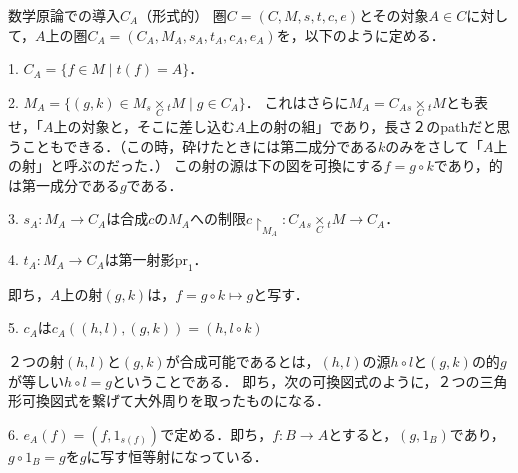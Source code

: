 \documentclass[uplatex, dvipdfmx]{jsarticle}
\begin{document}
\begin{itembox}[l]{数学原論での導入$C_A$（形式的）}
    圏$C=(C,M,s,t,c,e)$とその対象$A\in C$に対して，$A$上の圏$C_A=(C_A, M_A, s_A, t_A, c_A, e_A)$を，以下のように定める．

    1. $C_A=\{ f\in M\mid t(f)=A \}$．

    2. $M_A=\{(g,k)\in M_s\underset{C}{\times}{}_tM\mid g\in C_A\}$．
    これはさらに$M_A=C_A{}_s\underset{C}{\times}{}_tM$とも表せ，「$A$上の対象と，そこに差し込む$A$上の射の組」であり，長さ２のpathだと思うこともできる．（この時，砕けたときには第二成分である$k$のみをさして「$A$上の射」と呼ぶのだった．）
    この射の源は下の図を可換にする$f=g\circ k$であり，的は第一成分である$g$である．
    \begin{center}
    \end{center}

    3. $s_A:M_A\to C_A$は合成$c$の$M_A$への制限$c\restriction_{M_A}:C_A{}_s\underset{C}{\times}{}_tM\to C_A$．

    4. $t_A:M_A\to C_A$は第一射影$\mathrm{pr}_1$．

    即ち，$A$上の射$(g,k)$は，$f=g\circ k\mapsto g$と写す．

    5. $c_A$は$c_A((h,l),(g,k))=(h, l\circ k)$
    \begin{center}
    \end{center}
    ２つの射$(h,l)$と$(g,k)$が合成可能であるとは，$(h,l)$の源$h\circ l$と$(g,k)$の的$g$が等しい$h\circ l= g$ということである．
    即ち，次の可換図式のように，２つの三角形可換図式を繋げて大外周りを取ったものになる．
    \begin{center}
    \end{center}

    6. $e_A(f)=(f,1_{s(f)})$で定める．即ち，$f:B\to A$とすると，$(g,1_B)$であり，$g\circ 1_B=g$を$g$に写す恒等射になっている．
    \begin{center}
    \end{center}
\end{itembox}
\end{document}
